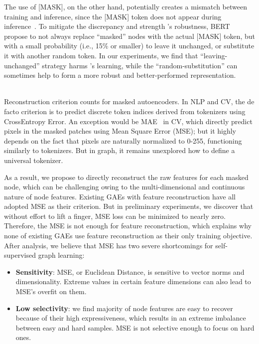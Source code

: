 {%
The use of [MASK], on the other hand, potentially creates a mismatch between training and
inference, since the [MASK] token does not appear during inference~\cite{yang2019xlnet}. To mitigate the discrepancy and strength \model's robustness, BERT propose to not always replace ``masked'' nodes with the actual [MASK] token, but with a small probability (i.e., 15\% or smaller) to leave it unchanged, or substitute it with another random token. In our experiments, we find that ``leaving-unchanged'' strategy harms \model's learning, while the ``random-substitution'' can sometimes help to form a more robust and better-performed representation. 

~\\
Reconstruction criterion counts for masked autoencoders. In NLP and CV, the de facto criterion is to predict discrete token indices derived from tokenizers using CrossEntropy Error. An exception would be MAE~\cite{he2021masked} in CV, which directly predict pixels in the masked patches using Mean Square Error (MSE); but it highly depends on the fact that pixels are naturally normalized to 0-255, functioning similarly to tokenizers. But in graph, it remains unexplored how to define a universal tokenizer. 

As a result, we propose to directly reconstruct the raw features for each masked node, which can be challenging owing to the multi-dimensional and continuous nature of node features. 
Existing GAEs with feature reconstruction have all adopted MSE as their criterion. But in preliminary experiments, we discover that without effort to lift a finger, MSE loss can be minimized to nearly zero. Therefore, the MSE is not enough for feature reconstruction, which explains why none of existing GAEs use feature reconstruction as their only training objective. After analysis, we believe that MSE has two severe shortcomings for self-supervised graph learning:

\begin{itemize}[leftmargin=*,itemsep=0pt,parsep=0.5em,topsep=0.3em,partopsep=0.3em]
    \item \textbf{Sensitivity}: MSE, or Euclidean Distance, is sensitive to vector norms and dimensionality. Extreme values in certain feature dimensions can also lead to MSE's overfit on them.
    \item \textbf{Low selectivity}: we find majority of node features are easy to recover because of their high expressiveness, which results in an extreme imbalance between easy and hard samples. MSE is not selective enough to focus \model on hard ones.
\end{itemize}

}
